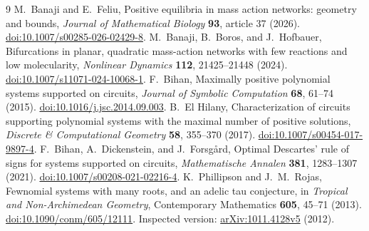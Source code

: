 \documentclass[11pt]{article}
\begin{document}
\begin{thebibliography}{9}
 M.~Banaji and E.~Feliu, Positive equilibria in mass action networks: geometry and bounds, \emph{Journal of Mathematical Biology} \textbf{93}, article 37 (2026). \href{https://doi.org/10.1007/s00285-026-02429-8}{doi:10.1007/s00285-026-02429-8}.
 M.~Banaji, B.~Boros, and J.~Hofbauer, Bifurcations in planar, quadratic mass-action networks with few reactions and low molecularity, \emph{Nonlinear Dynamics} \textbf{112}, 21425--21448 (2024). \href{https://doi.org/10.1007/s11071-024-10068-1}{doi:10.1007/s11071-024-10068-1}.
 F.~Bihan, Maximally positive polynomial systems supported on circuits, \emph{Journal of Symbolic Computation} \textbf{68}, 61--74 (2015). \href{https://doi.org/10.1016/j.jsc.2014.09.003}{doi:10.1016/j.jsc.2014.09.003}.
 B.~El Hilany, Characterization of circuits supporting polynomial systems with the maximal number of positive solutions, \emph{Discrete \& Computational Geometry} \textbf{58}, 355--370 (2017). \href{https://doi.org/10.1007/s00454-017-9897-4}{doi:10.1007/s00454-017-9897-4}.
 F.~Bihan, A.~Dickenstein, and J.~Forsg\aa rd, Optimal Descartes' rule of signs for systems supported on circuits, \emph{Mathematische Annalen} \textbf{381}, 1283--1307 (2021). \href{https://doi.org/10.1007/s00208-021-02216-4}{doi:10.1007/s00208-021-02216-4}.
 K.~Phillipson and J.~M.~Rojas, Fewnomial systems with many roots, and an adelic tau conjecture, in \emph{Tropical and Non-Archimedean Geometry}, Contemporary Mathematics \textbf{605}, 45--71 (2013). \href{https://doi.org/10.1090/conm/605/12111}{doi:10.1090/conm/605/12111}. Inspected version: \href{https://arxiv.org/abs/1011.4128v5}{arXiv:1011.4128v5} (2012).
\end{thebibliography}
\end{document}

